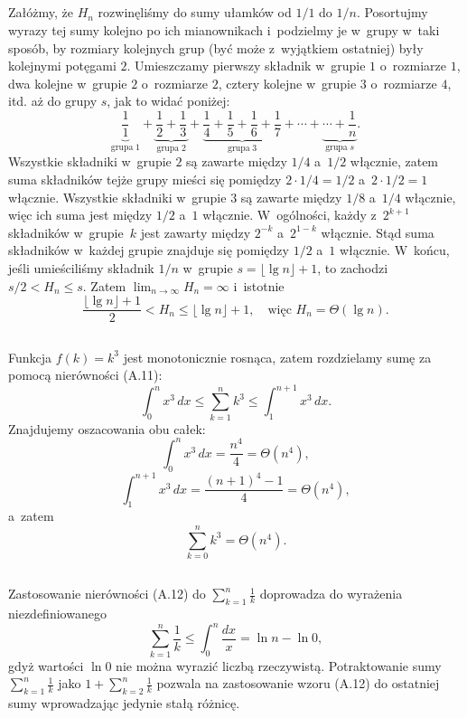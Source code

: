 \subsection{} %
Załóżmy, że $H_n$ rozwinęliśmy do sumy ułamków od $1/1$ do $1/n$. Posortujmy wyrazy tej sumy kolejno po ich mianownikach i~podzielmy je w~grupy w~taki sposób, by rozmiary kolejnych grup (być może z~wyjątkiem ostatniej) były kolejnymi potęgami $2$. Umieszczamy pierwszy składnik w~grupie $1$ o~rozmiarze $1$, dwa kolejne w~grupie $2$ o~rozmiarze $2$, cztery kolejne w~grupie $3$ o~rozmiarze $4$, itd. aż do grupy $s$, jak to widać poniżej:
\[
	\underbrace{\frac{1}{1}}_{\mathrm{grupa\;}1}+\underbrace{\frac{1}{2}+\frac{1}{3}}_{\mathrm{grupa\;} 2}+\underbrace{\frac{1}{4}+\frac{1}{5}+\frac{1}{6}+\frac{1}{7}}_{\mathrm{grupa\;}3}+\cdots+\underbrace{\cdots +\frac{1}{n}}_{\mathrm{grupa\;}s}.
\]
Wszystkie składniki w~grupie $2$ są zawarte między $1/4$ a~$1/2$ włącznie, zatem suma składników tejże grupy mieści się pomiędzy $2\cdot 1/4 = 1/2$ a~$2\cdot 1/2 = 1$ włącznie. Wszystkie składniki w~grupie $3$ są zawarte między $1/8$ a~$1/4$ włącznie, więc ich suma jest między $1/2$ a~$1$ włącznie. W~ogólności, każdy z~$2^{k+1}$ składników w~grupie~$k$ jest zawarty między $2^{-k}$ a~$2^{1-k}$ włącznie. Stąd suma składników w~każdej grupie znajduje się pomiędzy $1/2$ a~$1$ włącznie. W~końcu, jeśli umieściliśmy składnik $1/n$ w~grupie $s = \lfloor\lg n\rfloor+1$, to zachodzi $s/2<H_n\le s$. Zatem $\lim_{n\to\infty}H_n=\infty$ i~istotnie
\[
	\frac{\lfloor\lg n\rfloor+1}{2}<H_n\le\lfloor\lg n\rfloor+1,\quad\mbox{więc }H_n=\Theta(\lg n).
\]

\subsection{} %
Funkcja $f(k)=k^3$ jest monotonicznie rosnąca, zatem rozdzielamy sumę za pomocą nierówności (A.11):
\begin{equation*}
	\int_0^nx^3\,dx\le\sum_{k=1}^nk^3\le\int_1^{n+1}x^3\,dx.
\end{equation*}
Znajdujemy oszacowania obu całek:
\[
	\int_0^nx^3\,dx = \frac{n^4}{4} = \Theta(n^4),
\]
\[
	\int_1^{n+1}x^3\,dx = \frac{(n+1)^4-1}{4} = \Theta(n^4),
\]
a~zatem
\[
	\sum_{k=0}^nk^3 = \Theta(n^4).
\]

\subsection{} %
Zastosowanie nierówności (A.12) do $\sum_{k=1}^n\frac{1}{k}$ doprowadza do wyrażenia niezdefiniowanego
\[
	\sum_{k=1}^n\frac{1}{k}\le\int_0^n\frac{dx}{x}=\ln n-\ln 0,
\]
gdyż wartości $\ln 0$ nie można wyrazić liczbą rzeczywistą. Potraktowanie sumy $\sum_{k=1}^n\frac{1}{k}$ jako $1+\sum_{k=2}^n\frac{1}{k}$ pozwala na zastosowanie wzoru (A.12) do ostatniej sumy wprowadzając jedynie stałą różnicę.

